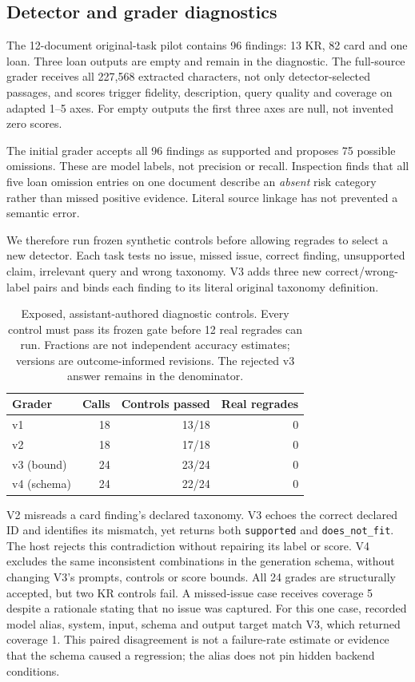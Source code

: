 \documentclass[11pt]{article}
\begin{document}
\subsection{Detector and grader diagnostics}
The 12-document original-task pilot contains 96 findings: 13 KR,
82 card and one loan. Three loan outputs are empty and remain in the
diagnostic. The full-source grader receives all 227,568 extracted
characters, not only detector-selected passages, and scores trigger
fidelity, description, query quality and coverage on adapted 1--5 axes.
For empty outputs the first three axes are null, not invented zero scores.

The initial grader accepts all 96 findings as supported and proposes 75
possible omissions. These are model labels, not precision or recall.
Inspection finds that all five loan omission entries on one document
describe an \emph{absent} risk category rather than missed positive
evidence. Literal source linkage has not prevented a semantic error.

We therefore run frozen synthetic controls before allowing regrades to
select a new detector. Each task tests no issue, missed issue, correct
finding, unsupported claim, irrelevant query and wrong taxonomy.
V3 adds three new correct/wrong-label pairs and binds each finding to its
literal original taxonomy definition.

\begin{table}[t]
\centering\small\setlength{\tabcolsep}{4pt}
\begin{tabular}{lrrr}
\toprule
Grader & Calls & Controls passed & Real regrades \\
\midrule
v1 & 18 & 13/18 & 0 \\
v2 & 18 & 17/18 & 0 \\
v3 (bound) & 24 & 23/24 & 0 \\
v4 (schema) & 24 & 22/24 & 0 \\
\bottomrule
\end{tabular}
\caption{Exposed, assistant-authored diagnostic controls. Every control
must pass its frozen gate before 12 real regrades can run. Fractions are
not independent accuracy estimates; versions are outcome-informed
revisions. The rejected v3 answer remains in the denominator.}
\label{tab:grader}
\end{table}

V2 misreads a card finding's declared taxonomy. V3 echoes the correct
declared ID and identifies its mismatch, yet returns both
\texttt{supported} and \texttt{does\_not\_fit}. The host rejects this
contradiction without repairing its label or score.
V4 excludes the same inconsistent combinations in the generation schema,
without changing V3's prompts, controls or score bounds. All 24 grades
are structurally accepted, but two KR controls fail. A missed-issue case
receives coverage 5 despite a rationale stating that no issue was captured.
For this one case, recorded model alias, system, input, schema and output
target match V3, which returned coverage 1. This paired disagreement is
not a failure-rate estimate or evidence that the schema caused a regression;
the alias does not pin hidden backend conditions.
\end{document}

